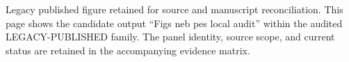 Legacy published figure retained for source and manuscript reconciliation. This page shows the candidate output ``Figs neb pes local audit'' within the audited LEGACY-PUBLISHED family. The panel identity, source scope, and current status are retained in the accompanying evidence matrix.
